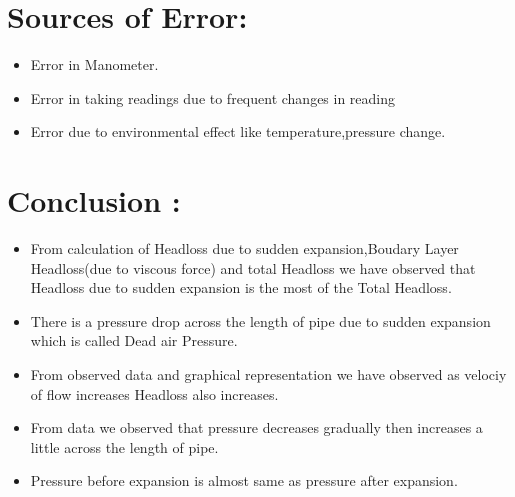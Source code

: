 \documentclass[12pt,a4paper]{article}
\begin{document}
\section{Sources of Error:}
\begin{itemize}
    \item Error in Manometer.
    \item Error in taking readings due to frequent changes in reading
    \item Error due to environmental effect like temperature,pressure change.
\end{itemize}



\section{Conclusion :}
\begin{itemize}
    \item From calculation of Headloss due to sudden expansion,Boudary Layer Headloss(due to viscous force) and total Headloss we have observed that Headloss due to sudden expansion is the most of the Total Headloss.
    \item There is a pressure drop across the length of pipe due to sudden expansion which is called Dead air Pressure.
    \item From observed data and graphical representation we have observed as velociy of flow increases Headloss also increases.
    \item From data we observed that pressure decreases gradually then increases a little across the length of pipe.
    \item Pressure before expansion is almost same as pressure after expansion.
\end{itemize}
\end{document}

